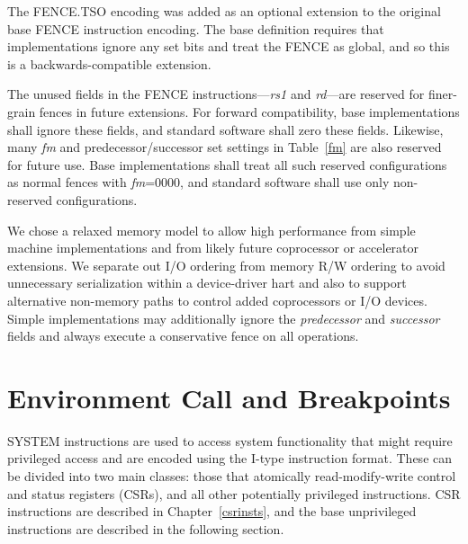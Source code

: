 \begin{commentary}
  The FENCE.TSO encoding was added as an optional extension to the
  original base FENCE instruction encoding.  The base definition
  requires that implementations ignore any set bits and treat the
  FENCE as global, and so this is a backwards-compatible extension.
\end{commentary}

The unused fields in the FENCE instructions---{\em rs1} and {\em rd}---are
reserved for finer-grain fences in future extensions.  For forward
compatibility, base implementations shall ignore these fields, and standard
software shall zero these fields.  Likewise, many {\em fm} and
predecessor/successor set settings in Table~\ref{fm} are also reserved
for future use.  Base implementations shall treat all such reserved
configurations as normal fences with {\em fm}=0000, and standard
software shall use only non-reserved configurations.

\begin{commentary}
We chose a relaxed memory model to allow high performance from simple
machine implementations and from likely future
coprocessor or accelerator extensions.  We separate out I/O ordering
from memory R/W ordering to avoid unnecessary serialization within a
device-driver hart and also to support alternative non-memory paths
to control added coprocessors or I/O devices.  Simple implementations
may additionally ignore the {\em predecessor} and {\em successor}
fields and always execute a conservative fence on all operations.
\end{commentary}

\begin{formalspec}
  \sailfclFENCEexecute
  \sailfclFENCEUnderscoreTSOexecute
\end{formalspec}

\section{Environment Call and Breakpoints}

SYSTEM instructions are used to access system functionality that might
require privileged access and are encoded using the I-type instruction
format.  These can be divided into two main classes: those that
atomically read-modify-write control and status registers (CSRs), and
all other potentially privileged instructions. CSR instructions are
described in Chapter~\ref{csrinsts}, and the base unprivileged instructions
are described in the following section.

